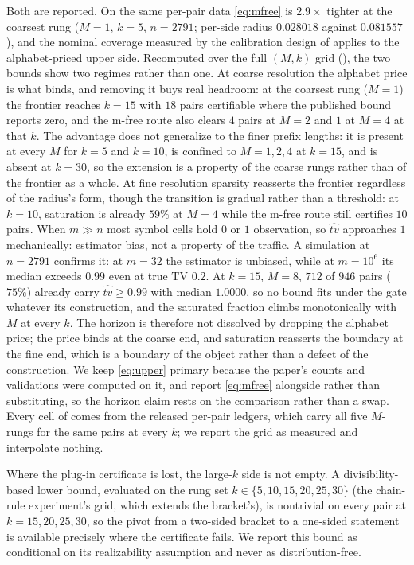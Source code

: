 Both are reported. On the same per-pair data \eqref{eq:mfree} is $2.9\times$
tighter at the coarsest rung ($M{=}1$, $k{=}5$, $n{=}2791$; per-side radius
$0.028018$ against $0.081557$), and the nominal coverage measured by the calibration design of
 applies to the alphabet-priced upper side. Recomputed over the full
$(M,k)$ grid (), the two bounds show two regimes rather than one. At coarse resolution the
alphabet price is what binds, and removing it buys real headroom: at the coarsest
rung ($M{=}1$) the frontier reaches $k{=}15$ with $18$ pairs certifiable where
the published bound reports zero, and the m-free route also clears $4$ pairs at
$M{=}2$ and $1$ at $M{=}4$ at that $k$. The advantage does not generalize to the finer
prefix lengths: it is present at every $M$ for $k{=}5$ and $k{=}10$, is confined
to $M{=}1,2,4$ at $k{=}15$, and is absent at $k{=}30$, so the extension is a
property of the coarse rungs rather than of the frontier as a whole. At fine resolution
sparsity reasserts the frontier regardless of the radius's form, though the
transition is gradual rather than a threshold: at $k{=}10$, saturation is
already $59\%$ at $M{=}4$ while the m-free route still certifies $10$ pairs.
When $m \gg n$ most symbol cells hold $0$ or $1$ observation, so $\widehat{tv}$
approaches $1$ mechanically: estimator bias, not a property of the traffic. A
simulation at $n{=}2791$ confirms it: at $m{=}32$ the estimator is unbiased,
while at $m{=}10^6$ its median exceeds $0.99$ even at true TV $0.2$. At
$k{=}15$, $M{=}8$, $712$ of $946$
pairs ($75\%$) already carry $\widehat{tv}\ge0.99$ with median $1.0000$, so no
bound fits under the gate whatever its construction, and the saturated fraction
climbs monotonically with $M$ at every $k$. The horizon is therefore not dissolved by dropping the alphabet
price; the price binds at the coarse end, and saturation reasserts the boundary
at the fine end, which is a boundary of the object rather than a defect of the
construction. We keep
\eqref{eq:upper} primary because the paper's counts and validations were computed
on it, and report \eqref{eq:mfree} alongside rather than substituting, so the
horizon claim rests on the comparison rather than a swap. Every cell of
 comes from the released per-pair ledgers, which carry all five
$M$-rungs for the same pairs at every $k$; we report the grid as measured and
interpolate nothing.

Where the plug-in certificate is lost, the large-$k$ side is not empty. A
divisibility-based lower bound, evaluated on the rung set
$k \in \{5,10,15,20,25,30\}$ (the chain-rule experiment's grid, which extends the
bracket's), is nontrivial on every pair at $k{=}15,20,25,30$, so the pivot from a
two-sided bracket to a one-sided statement is available precisely where the
certificate fails. We report this bound as conditional on its realizability
assumption and never as distribution-free.

